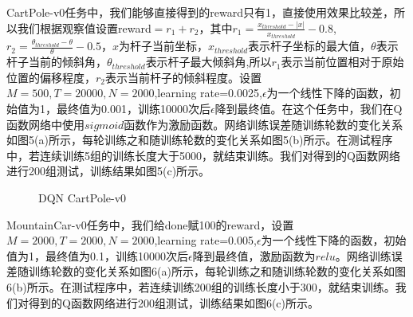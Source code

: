 \documentclass[a4paper,UTF8]{article}
\theoremstyle{definition}
\begin{document}
	CartPole-v0任务中，我们能够直接得到的reward只有1，直接使用效果比较差，所以我们根据观察值设置reward$=r_1+r_2$，其中$r_1=\frac{x_{threshold}-|x|}{x_{threshold}}-0.8$,$r_2=\frac{\theta_{threshold}-\theta}{\theta}-0.5$，$x$为杆子当前坐标，$x_{threshold}$表示杆子坐标的最大值，$\theta$表示杆子当前的倾斜角，$\theta_{threshold}$表示杆子最大倾斜角,所以$r_1$表示当前位置相对于原始位置的偏移程度，$r_2$表示当前杆子的倾斜程度。设置$M=500,T=20000,N=2000$,learning rate=0.0025,$\epsilon$为一个线性下降的函数，初始值为1，最终值为0.001，训练10000次后$\epsilon$降到最终值。在这个任务中，我们在Q函数网络中使用$sigmoid$函数作为激励函数。网络训练误差随训练轮数的变化关系如图5(a)所示，每轮训练之和随训练轮数的变化关系如图5(b)所示。在测试程序中，若连续训练5组的训练长度大于5000，就结束训练。我们对得到的Q函数网络进行200组测试，训练结果如图5(c)所示。

\begin{figure}[!h]
	\centering
	\caption{DQN CartPole-v0}

\end{figure}

	MountainCar-v0任务中，我们给done赋100的reward，设置$M=2000,T=2000,N=2000$,learning rate=0.005,$\epsilon$为一个线性下降的函数，初始值为1，最终值为0.1，训练10000次后$\epsilon$降到最终值，激励函数为$relu$。网络训练误差随训练轮数的变化关系如图6(a)所示，每轮训练之和随训练轮数的变化关系如图6(b)所示。在测试程序中，若连续训练200组的训练长度小于300，就结束训练。我们对得到的Q函数网络进行200组测试，训练结果如图6(c)所示。
\end{document}
